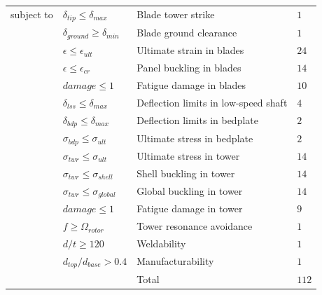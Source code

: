 \documentclass[]{aiaa-tc} %
\begin{document}
\begin{table}
\begin{tabular}{r l l l}
            \\
            subject to          & $\delta_{tip} \le \delta_{max}$ & Blade tower strike & $1$ \\
                                    & $\delta_{ground} \ge \delta_{min}$ & Blade ground clearance & $1$ \\
                                    & $\epsilon \le \epsilon_{ult}$ & Ultimate strain in blades & $24$ \\
                                    & $\epsilon \le \epsilon_{cr}$ & Panel buckling in blades & $14$ \\
                                    & $damage \le 1$ & Fatigue damage in blades & $10$ \\
                                    & $\delta_{lss} \le \delta_{max}$ & Deflection limits in low-speed shaft & $4$ \\
                                    & $\delta_{bdp} \le \delta_{max}$ & Deflection limits in bedplate & $2$ \\
                                    & $\sigma_{bdp} \le \sigma_{ult}$ & Ultimate stress in bedplate & $2$ \\
                                    & $\sigma_{twr} \le \sigma_{ult}$ & Ultimate stress in tower & $14$ \\
                                    & $\sigma_{twr} \le \sigma_{shell}$ & Shell buckling in tower & $14$ \\
                                    & $\sigma_{twr} \le \sigma_{global}$ & Global buckling in tower & $14$ \\
                                    & $damage \le 1$ & Fatigue damage in tower & $9$ \\
                                    & $f \ge \Omega_{rotor}$ & Tower resonance avoidance & $1$ \\
                                    & $d/t \ge 120$ & Weldability & $1$ \\
                                    & $d_{top}/d_{base} > 0.4$ & Manufacturability & $1$ \\
                                    & & Total & $112$ \\
            \hline
        \end{tabular}
        \label{tab:coe_formulation}
    \end{table}
\end{document}
